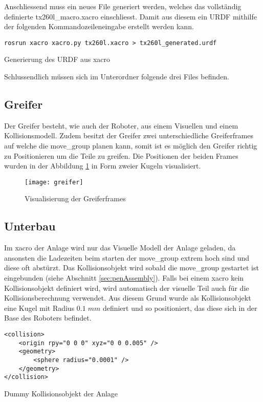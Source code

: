 Anschliessend muss ein neues File generiert werden, welches das vollständig definierte tx260l\_macro.xacro einschliesst. Damit aus diesem ein URDF mithilfe der folgenden Kommandozeileneingabe erstellt werden kann.
\begin{code}
	\begin{verbatim}
rosrun xacro xacro.py tx260l.xacro > tx260l_generated.urdf	
	\end{verbatim}
	\vspace{-15pt}
	\caption{Generierung des URDF aus xacro}
	\label{code:xacroToURDF}
\end{code}
Schlussendlich müssen sich im Unterordner folgende drei Files befinden.

\subsection{Greifer}
Der Greifer besteht, wie auch der Roboter, aus einem Visuellen und einem Kollisionsmodell. Zudem besitzt der Greifer zwei unterschiedliche Greiferframes auf welche die move\_group planen kann, somit ist es möglich den Greifer richtig zu Positionieren um die Teile zu greifen. Die Positionen der beiden Frames wurden in der Abbildung \ref{fig:Greifer} in Form zweier Kugeln visualisiert.
\begin{figure}[H]
	\centering
	\texttt{[image: greifer]}
	\caption{Visualisierung der Greiferframes}
	\label{fig:Greifer}
\end{figure}

\subsection{Unterbau}
Im xacro der Anlage wird nur das Visuelle Modell der Anlage geladen, da ansonsten die Ladezeiten beim starten der move\_group extrem hoch sind und diese oft abstürzt. Das Kollisionsobjekt wird sobald die move\_group gestartet ist eingebunden (siehe Abschnitt \ref{sec:penAssembly}). Falls bei einem xacro kein Kollisionsobjekt definiert wird, wird automatisch der visuelle Teil auch für die Kollisionsberechnung verwendet. Aus diesem Grund wurde als Kollisionsobjekt eine Kugel mit Radius $0.1\;mm$ definiert und so positioniert, das diese sich in der Base des Roboters befindet.
\begin{code}
	\begin{verbatim}
<collision>
	<origin rpy="0 0 0" xyz="0 0 0.005" />
	<geometry>
		<sphere radius="0.0001" />
	</geometry>
</collision>	
	\end{verbatim}
	\vspace{-15pt}
	\caption{Dummy Kollisionsobjekt der Anlage}
	\label{code:dummyAnlage}
\end{code}


